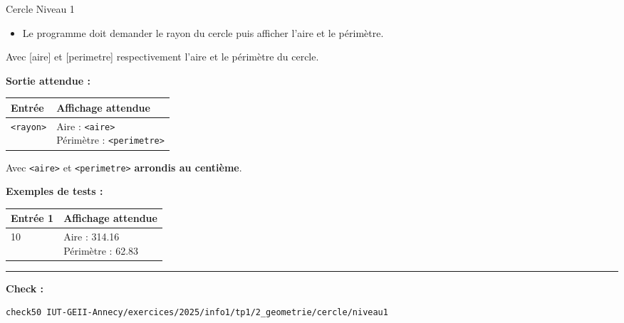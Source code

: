 \begin{UPSTIcahierDesCharges}{Cercle Niveau 1}
	\begin{itemize}
		\item Le programme doit demander le rayon du cercle puis afficher l'aire et le périmètre.
	\end{itemize}

	Avec [aire] et [perimetre] respectivement l'aire et le périmètre du cercle.

	\textbf{Sortie attendue :}
	\begin{center}
		\begin{tabular}{|l|l|}
			\hline
			Entrée           & Affichage attendue                   \\
			\hline
			\texttt{<rayon>} & \makecell[tl]{Aire : \texttt{<aire>} \\Périmètre : \texttt{<perimetre>}} \\
			\hline
		\end{tabular}
	\end{center}
	Avec \texttt{<aire>} et \texttt{<perimetre>} \textbf{arrondis au centième}.

	\textbf{Exemples de tests :}
	\begin{center}
		\begin{tabular}{|l|l|}
			\hline
			Entrée 1 & Affichage attendue          \\
			\hline
			10       & \makecell[tl]{Aire : 314.16 \\Périmètre : 62.83} \\
			\hline
		\end{tabular}
	\end{center}
	\hrule
	\textbf{Check :}
	\begin{lstlisting}[language=bash,style=console]
check50 IUT-GEII-Annecy/exercices/2025/info1/tp1/2_geometrie/cercle/niveau1
\end{lstlisting}
\end{UPSTIcahierDesCharges}





